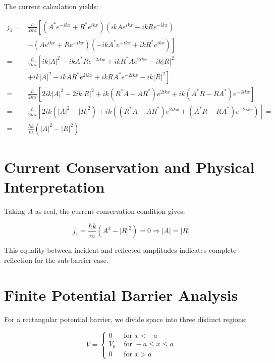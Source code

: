 The current calculation yields:

\begin{align}
j_{1}= & \frac{\hbar}{2 m i}\left[\left(A^{*} e^{-i k x}+R^{*} e^{i k x}\right)\left(i k A e^{i k x}-i k R e^{-i k x}\right)\right. \\
& \left.-\left(A e^{i k x}+R e^{-i k x}\right)\left(-i k A^{*} e^{-i k x}+i k R^{*} e^{i k x}\right)\right] \\
= & \frac{\hbar}{2 m i}\left[i k|A|^{2}-i k A^{*} R e^{-2 i k x}+i k R^{*} A e^{2 i k x}-i k|R|^{2}\right. \\
& \left.+i k|A|^{2}-i k A R^{*} e^{2 i k x}+i k R A^{*} e^{-2 i k x}-i k|R|^{2}\right] \\
= & \frac{\hbar}{2 m i}\left[2 i k|A|^{2}-2 i k|R|^{2}+i k\left(R^{*} A-A R^{*}\right) e^{2 i k x}+i k\left(A^{*} R-R A^{*}\right) e^{-2 i k x}\right] \\
= & \frac{\hbar}{2 m i}\left[2 i k\left(|A|^{2}-|R|^{2}\right)+i k\left(\left(R^{*} A-A R^{*}\right) e^{2 i k x}+\left(A^{*} R-R A^{*}\right) e^{-2 i k x}\right)\right]= \\
= & \frac{\hbar k}{m}\left(|A|^{2}-|R|^{2}\right)
\end{align}


\section{Current Conservation and Physical Interpretation}

Taking $A$ as real, the current conservation condition gives:

\begin{equation}
j_{1}=\frac{\hbar k}{m}\left(A^{2}-|R|^{2}\right)=0 \Longrightarrow|A|=|R|
\end{equation}

This equality between incident and reflected amplitudes indicates complete reflection for the sub-barrier case.

\section{Finite Potential Barrier Analysis}

For a rectangular potential barrier, we divide space into three distinct regions:

\[
V= \begin{cases}0 & \text { for } x<-a  \\ V_{0} & \text { for }-a \leq x \leq a \\ 0 & \text { for } x>a\end{cases}
\]

